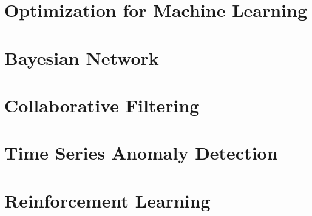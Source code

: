 \documentclass[10pt, twoside]{book}   	%
\begin{document}
\chapter{Optimization for Machine Learning}



\chapter{Bayesian Network}



\chapter{Collaborative Filtering}


\chapter{Time Series Anomaly Detection}


\chapter{Reinforcement Learning}



\iffalse
\appendix
\appendixpage
\addappheadtotoc


\chapter{Amazon Machine Learning University}



\fi
\end{document}
